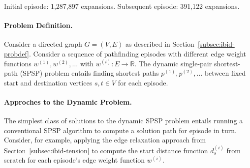 \begin{marginfigure}%
   \centering%
   
   \caption{Initial episode: 1,287,897 expansions.
      Subsequent episode: 391,122 expansions.}%
\end{marginfigure}

\paragraph{Problem Definition.}
Consider a directed graph $G = (V,E)$ as described in
Section~\ref{subsec:ibid-probdef}.
Consider a sequence of pathfinding episodes
with different edge weight functions $w^{(1)}, w^{(2)}, \dots$
with $w^{(i)} : E \rightarrow \mathbb{R}$.
The dynamic single-pair shortest-path (SPSP) problem
entails finding shortest paths $p^{(1)}, p^{(2)}, \dots$
between fixed start and destination vertices $s,t \in V$
for each episode.

\paragraph{Approches to the Dynamic Problem.}
The simplest class of solutions to the dynamic SPSP problem
entails running a conventional SPSP algorithm to compute a solution
path for episode in turn.
Consider, for example, applying the edge relaxation approach
from Section~\ref{subsec:ibid-tension}
to compute the start distance function $d_s^{(i)}$ from scratch
for each episode's edge weight function $w^{(i)}$.

